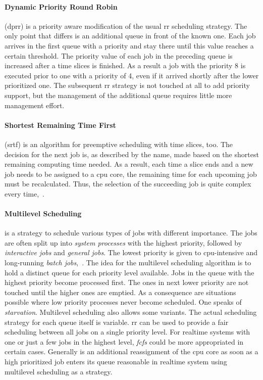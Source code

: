 \paragraph{Dynamic Priority Round Robin}
(\ac{dprr}) is a priority aware modification of the usual \ac{rr} scheduling strategy.
The only point that differs is an additional queue in front of the known one.
Each job arrives in the first queue with a priority and stay there until this value reaches a certain threshold.
The priority value of each job in the preceding queue is increased after a time slices is finished.
As a result a job with the priority 8 is executed prior to one with a priority of 4, even if it arrived shortly after the lower prioritized one.
The subsequent \ac{rr} strategy is not touched at all to add priority support, but the management of the additional queue requires little more management effort\cite{brause2017betriebssysteme}.

\paragraph{Shortest Remaining Time First}
(\ac{srtf}) is an algorithm for preemptive scheduling with time slices, too.
The decision for the next job is, as described by the name, made based on the shortest remaining computing time needed.
As a result, each time a slice ends and a new job needs to be assigned to a \ac{cpu} core, the remaining time for each upcoming job must be recalculated. 
Thus, the selection of the succeeding job is quite complex every time\cite{brause2017betriebssysteme},~\cite{glatz2015betriebssysteme}.

\paragraph{Multilevel Scheduling}
is a strategy to schedule various types of jobs with different importance.
The jobs are often split up into \textit{system processes} with the highest priority, followed by \textit{interactive jobs} and \textit{general jobs}. 
The lowest priority is given to \ac{cpu}-intensive and long-running \textit{batch jobs}\cite{brause2017betriebssysteme},~\cite{mandl2014Grundkurs}.
The idea for the multilevel scheduling algorithm is to hold a distinct queue for each priority level available.
Jobs in the queue with the highest priority become processed first. 
The ones in next lower priority are not touched until the higher ones are emptied.
As a consequence are situations possible where low priority processes never become scheduled.
One speaks of \textit{starvation}\cite{glatz2015betriebssysteme}.
Multilevel scheduling also allows some variants.
The actual scheduling strategy for each queue itself is variable.
\ac{rr} can be used to provide a fair scheduling between all jobs on a single priority level.
For realtime systems with one or just a few jobs in the highest level, \textit{\ac{fcfs}} could be more appropriated in certain cases.
Generally is an additional reassignment of the \ac{cpu} core as soon as a high prioritized job enters its queue reasonable in realtime system using multilevel scheduling as a strategy\cite{glatz2015betriebssysteme}.

